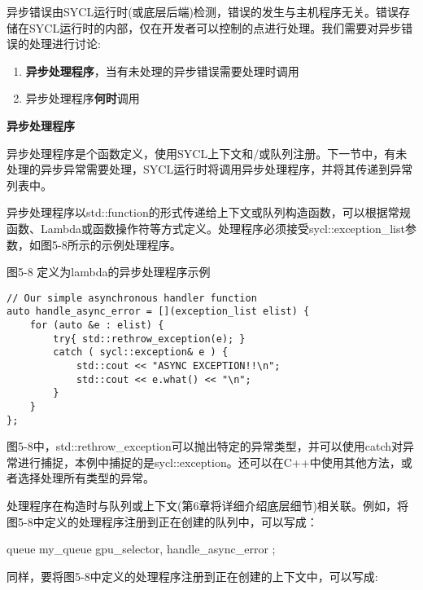 异步错误由SYCL运行时(或底层后端)检测，错误的发生与主机程序无关。错误存储在SYCL运行时的内部，仅在开发者可以控制的点进行处理。我们需要对异步错误的处理进行讨论:\par

\begin{enumerate}
	\item \textbf{异步处理程序}，当有未处理的异步错误需要处理时调用
	\item 异步处理程序\textbf{何时}调用
\end{enumerate}

\hspace*{\fill} \par %
\textbf{异步处理程序}

异步处理程序是个函数定义，使用SYCL上下文和/或队列注册。下一节中，有未处理的异步异常需要处理，SYCL运行时将调用异步处理程序，并将其传递到异常列表中。\par

异步处理程序以std::function的形式传递给上下文或队列构造函数，可以根据常规函数、Lambda或函数操作符等方式定义。处理程序必须接受sycl::exception\_list参数，如图5-8所示的示例处理程序。\par

\hspace*{\fill} \par %
图5-8 定义为lambda的异步处理程序示例
\begin{lstlisting}[caption={}]
// Our simple asynchronous handler function
auto handle_async_error = [](exception_list elist) {
	for (auto &e : elist) {
		try{ std::rethrow_exception(e); }
		catch ( sycl::exception& e ) {
			std::cout << "ASYNC EXCEPTION!!\n";
			std::cout << e.what() << "\n";
		}
	}
};
\end{lstlisting}

图5-8中，std::rethrow\_exception可以抛出特定的异常类型，并可以使用catch对异常进行捕捉，本例中捕捉的是sycl::exception。还可以在C++中使用其他方法，或者选择处理所有类型的异常。\par

处理程序在构造时与队列或上下文(第6章将详细介绍底层细节)相关联。例如，将图5-8中定义的处理程序注册到正在创建的队列中，可以写成：\par

queue my\_queue{ gpu\_selector{}, handle\_async\_error };\par

同样，要将图5-8中定义的处理程序注册到正在创建的上下文中，可以写成:\par

